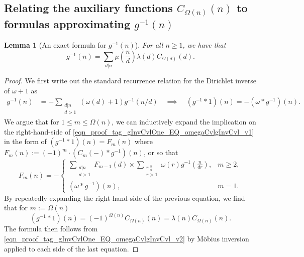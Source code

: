 \documentclass[11pt,reqno,a4letter]{article}
\numberwithin{figure}{section}
\numberwithin{table}{section}
\theoremstyle{plain}
\newtheorem{lemma}[theorem]{Lemma}
\numberwithin{theorem}{section}
\theoremstyle{definition}
\begin{document}
\subsection{Relating the auxiliary functions $C_{\Omega(n)}(n)$ to formulas approximating $g^{-1}(n)$} 
\label{subSection_Relating_CknFuncs_to_gInvn} 

\begin{lemma}[An exact formula for $g^{-1}(n)$] 
\label{lemma_AnExactFormulaFor_gInvByMobiusInv_v1} 
For all $n \geq 1$, we have that 
\[
g^{-1}(n) = \sum_{d|n} \mu\left(\frac{n}{d}\right) \lambda(d) C_{\Omega(d)}(d). 
\]
\end{lemma}
\begin{proof} 
We first write out the standard recurrence relation for the Dirichlet inverse of 
$\omega+1$ as 
\begin{align} 
\label{eqn_proof_tag_gInvCvlOne_EQ_omegaCvlgInvCvl_v1} 
g^{-1}(n) & = - \sum_{\substack{d|n \\ d>1}} (\omega(d) + 1) g^{-1}(n/d) 
     \quad\implies\quad 
     (g^{-1} \ast 1)(n) = -(\omega \ast g^{-1})(n). 
\end{align} 
We argue that for $1 \leq m \leq \Omega(n)$, we can inductively expand the 
implication on the right-hand-side of \eqref{eqn_proof_tag_gInvCvlOne_EQ_omegaCvlgInvCvl_v1} 
in the form of $(g^{-1} \ast 1)(n) = F_m(n)$ where 
$F_m(n) := (-1)^{m} \cdot (C_m(-) \ast g^{-1})(n)$, or so that 
\[
F_m(n) = - 
     \begin{cases} 
     \sum\limits_{\substack{d|n \\ d > 1}} F_{m-1}(d) \times \sum\limits_{\substack{r|\frac{n}{d} \\ r > 1}} 
     \omega(r) g^{-1}\left(\frac{n}{dr}\right), & m \geq 2, \\ 
     (\omega \ast g^{-1})(n), & m = 1. 
     \end{cases} 
\]
By repeatedly expanding the right-hand-side of the previous equation, 
we find that for $m := \Omega(n)$ 
\begin{equation} 
\label{eqn_proof_tag_gInvCvlOne_EQ_omegaCvlgInvCvl_v2} 
(g^{-1} \ast 1)(n) = (-1)^{\Omega(n)} C_{\Omega(n)}(n) = \lambda(n) C_{\Omega(n)}(n). 
\end{equation} 
The formula then follows from \eqref{eqn_proof_tag_gInvCvlOne_EQ_omegaCvlgInvCvl_v2} 
by M\"obius inversion applied to each side of the last equation. 
\end{proof} 
\end{document}

